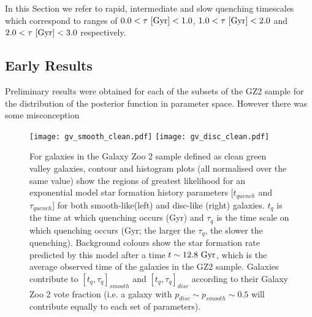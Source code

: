 \documentclass{mn2e}
\begin{document}
%

In this Section we refer to rapid, intermediate and slow quenching timescales which correspond to ranges of $0.0 < \tau ~\rm{[Gyr]} < 1.0$, $1.0 < \tau ~\rm{[Gyr]} < 2.0$ and $2.0 < \tau ~\rm{[Gyr]} < 3.0$ respectively. 

\subsection{Early Results}
Preliminary results were obtained for each of the subsets of the GZ2 sample for the distribution of the posterior function in parameter space. However there was some misconception 
\begin{figure*}
\texttt{[image: gv\_smooth\_clean.pdf]}
\texttt{[image: gv\_disc\_clean.pdf]}
\caption{For galaxies in the Galaxy Zoo 2 sample defined as clean green valley galaxies, contour and histogram plots (all normalised over the same value) show the regions of greatest likelihood for an exponential model star formation history parameters $[t_{quench}$ and $\tau_{quench}]$ for both smooth-like(left) and disc-like (right) galaxies. $t_{q}$ is the time at which quenching occurs (Gyr) and $\tau_{q}$ is the time scale on which quenching occurs (Gyr; the larger the $\tau_{q}$, the slower the quenching). Background colours show the star formation rate predicted by this model after a time $t \sim 12.8~\rm{Gyr}$, which is the average observed time of the galaxies in the GZ2 sample. Galaxies contribute  to $[t_{q}, \tau_{q}]_{smooth}$ and $[t_{q}, \tau_{q}]_{disc}$ according to their Galaxy Zoo 2 vote fraction (i.e. a galaxy with $p_{disc} \sim p_{smooth} \sim 0.5$ will contribute equally to each set of parameters).}
\label{gv_clean}
\end{figure*}
\end{document}
